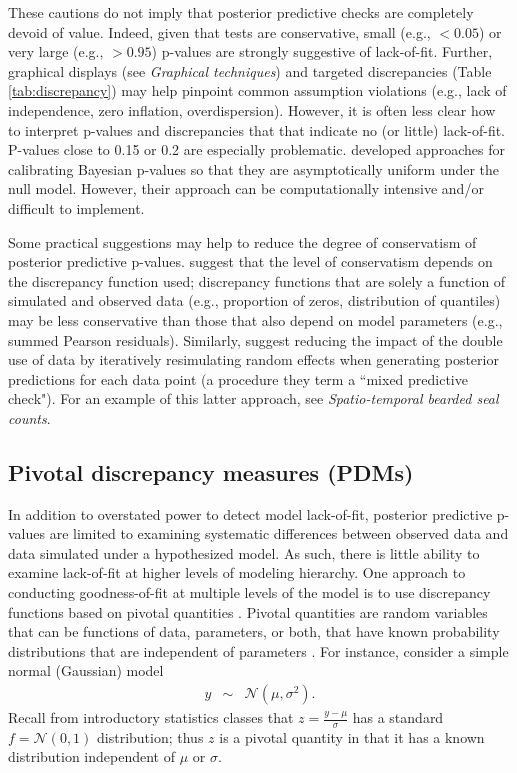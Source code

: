 \documentclass[12pt,english]{article}
\begin{document}
\begin{spacing}{1.9}
These cautions do not imply that posterior predictive checks are completely devoid of value.  Indeed, given that tests are conservative, small (e.g., $<0.05$) or very large (e.g., $>0.95$) p-values are strongly suggestive of lack-of-fit.  Further, graphical displays (see \textit{Graphical techniques}) and targeted discrepancies (Table \ref{tab:discrepancy}) may help pinpoint common assumption violations (e.g., lack of independence, zero inflation, overdispersion).  However, it is often less clear how to interpret p-values and discrepancies that that indicate no (or little) lack-of-fit. P-values close to 0.15 or 0.2 are especially problematic.
\citet{HjortEtAl2006} developed approaches for calibrating Bayesian p-values so that they are asymptotically uniform under the null model.  However, their approach can be computationally intensive and/or difficult to implement.

Some practical suggestions may help to reduce the degree of conservatism of posterior predictive p-values.  \citet{LunnEtAl2013} suggest that the level of conservatism depends on the discrepancy function used; discrepancy functions that are solely a function of simulated and observed data (e.g., proportion of zeros, distribution of quantiles) may be less conservative than those that also depend on model parameters (e.g., summed Pearson residuals).  Similarly, \citet{MarshallSpiegelhalter2003} suggest reducing the impact of the double use of data by iteratively resimulating random effects when generating posterior predictions for each data point (a procedure they term a ``mixed predictive check").  For an example of this latter approach, see \textit{Spatio-temporal bearded seal counts}.


\subsection{Pivotal discrepancy measures (PDMs)}

In addition to overstated power to detect model lack-of-fit, posterior predictive p-values are limited to examining systematic differences between observed data and data simulated under a hypothesized model.  As such, there is little ability to examine lack-of-fit at higher levels of modeling hierarchy.  One approach to conducting goodness-of-fit at multiple levels of the model is to use discrepancy functions based on pivotal quantities \citep{Johnson2004,YuanJohnson2012}.  Pivotal quantities are random variables that can be functions of data, parameters, or both, that have known probability distributions that are independent of parameters \citep[see e.g.,][section 9.2.2]{CasellaBerger1990}.  For instance, consider a simple normal (Gaussian) model
\begin{eqnarray*}
  y & \sim & \mathcal{N}(\mu,\sigma^2).
\end{eqnarray*}
Recall from introductory statistics classes that $z = \frac{y-\mu}{\sigma}$ has a standard $f=\mathcal{N}(0,1)$ distribution; thus $z$ is a pivotal quantity in that it has a known distribution independent of $\mu$ or $\sigma$.


\end{spacing}
\end{document}
